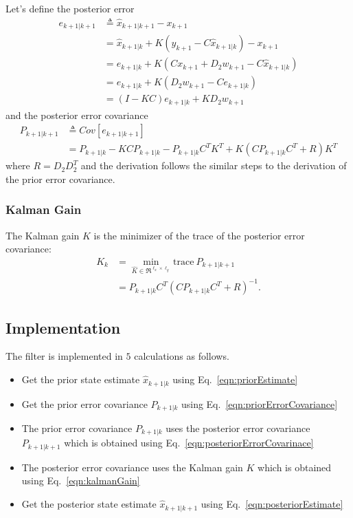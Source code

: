 Let's define the posterior error
\begin{align}
    e_{k+1|k+1} &\triangleq \hat{x}_{k+1|k+1} - x_{k+1} \\
    &= \hat{x}_{k+1|k} + K (y_{k+1} - C \hat{x}_{k+1|k}) - x_{k+1} \\
    &= e_{k+1|k} + K (C x_{k+1} + D_2 w_{k+1} - C \hat{x}_{k+1|k}) \\
    &= e_{k+1|k} + K(D_2 w_{k+1} - C e_{k+1|k}) \\
    &= (I - KC) e_{k+1|k} + K D_2 w_{k+1}
\end{align}
and the posterior error covariance
\begin{align}
    P_{k+1|k+1} &\triangleq Cov[e_{k+1|k+1}] \\
    &= P_{k+1|k} - KCP_{k+1|k} - P_{k+1|k}C^T K^T + K(CP_{k+1|k} C^T +R)K^T \label{eqn:posteriorErrorCovarinace}
\end{align}
where $R = D_2 D_2^T$ and the derivation follows the similar steps to the derivation of the prior error covariance.

\subsubsection{Kalman Gain}
\hspace{\parindent}The Kalman gain $K$ is the minimizer of the trace of the posterior error covariance:
\begin{align}
    K_k &= \min_{\hat{K} \in\Re^{\ell_x \times \ell_y}} \text{trace} \: P_{k+1|k+1} \\
    &= P_{k+1|k} C^T (C P_{k+1|k} C^T + R)^{-1}.
    \label{eqn:kalmanGain}
\end{align}

\subsection{Implementation}
\hspace{\parindent}The filter is implemented in $5$ calculations as follows.
\begin{itemize}
    \item Get the prior state estimate $\hat{x}_{k+1|k}$ using Eq.~\ref{eqn:priorEstimate}
    \item Get the prior error covariance $P_{k+1|k}$ using Eq.~\ref{eqn:priorErrorCovariance}
    \item The prior error covariance $P_{k+1|k}$ uses the posterior error covariance $P_{k+1|k+1}$ which is obtained using Eq.~\ref{eqn:posteriorErrorCovarinace}
    \item The posterior error covariance uses the Kalman gain $K$ which is obtained using Eq.~\ref{eqn:kalmanGain}
    \item Get the posterior state estimate $\hat{x}_{k+1|k+1}$ using Eq.~\ref{eqn:posteriorEstimate}
\end{itemize}

